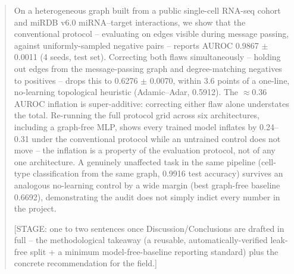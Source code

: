 \documentclass{bmcart}
\begin{document}
\begin{frontmatter}
\begin{abstractbox}
\begin{abstract}
On a heterogeneous graph built from a public single-cell RNA-seq cohort and miRDB v6.0
miRNA--target interactions, we show that the conventional protocol -- evaluating on
edges visible during message passing, against uniformly-sampled negative pairs --
reports AUROC 0.9867 $\pm$ 0.0011 (4 seeds, test set). Correcting both flaws
simultaneously -- holding out edges from the message-passing graph and degree-matching
negatives to positives -- drops this to 0.6276 $\pm$ 0.0070, within 3.6 points of a
one-line, no-learning topological heuristic (Adamic--Adar, 0.5912). The $\approx$0.36
AUROC inflation is super-additive: correcting either flaw alone understates the total.
Re-running the full protocol grid across six architectures, including a graph-free MLP,
shows every trained model inflates by 0.24--0.31 under the conventional protocol while
an untrained control does not move -- the inflation is a property of the evaluation
protocol, not of any one architecture. A genuinely unaffected task in the same pipeline
(cell-type classification from the same graph, 0.9916 test accuracy) survives an
analogous no-learning control by a wide margin (best graph-free baseline 0.6692),
demonstrating the audit does not simply indict every number in the project.

[STAGE: one to two sentences once Discussion/Conclusions are drafted in full -- the
methodological takeaway (a reusable, automatically-verified leak-free split + a minimum
model-free-baseline reporting standard) plus the concrete recommendation for the field.]
\end{abstract}

\begin{keyword}
\end{keyword}

\end{abstractbox}

\end{frontmatter}
\end{document}
